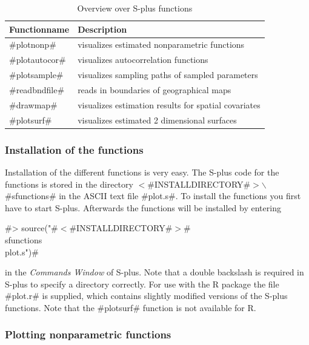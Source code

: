 \begin{table}[ht]
\begin{center}
\begin{tabular}{|l|l|}
\hline
{\bf Functionname} & {\bf Description} \\
\hline
#plotnonp# & visualizes estimated nonparametric functions \\
#plotautocor# & visualizes autocorrelation functions \\
#plotsample# & visualizes sampling paths of sampled parameters \\
#readbndfile# & reads in boundaries of geographical maps \\
#drawmap# & visualizes estimation results for spatial covariates \\
#plotsurf# & visualizes estimated 2 dimensional surfaces \\
\hline
\end{tabular}
{\em\caption{\label{plotfunctions} Overview over S-plus
functions}}
\end{center}
\end{table}


\subsubsection{Installation of the functions}

Installation of the different functions is very easy. The S-plus
code for the functions is stored in the directory
$<$#INSTALLDIRECTORY#$>$$\backslash$#sfunctions# in the ASCII text
file #plot.s#. To install the functions you first have to start
S-plus. Afterwards the functions will be installed by entering

#> source("#$<$#INSTALLDIRECTORY#$>$#\\sfunctions\\plot.s")#

in the {\em Commands Window} of S-plus. Note that a double
backslash is required in S-plus to specify a directory correctly.
For use with the R package the file #plot.r# is supplied, which
contains slightly modified versions of the S-plus functions. Note
that the #plotsurf# function is not available for R.


\subsubsection{Plotting nonparametric functions}
\label{plotnonp}  

